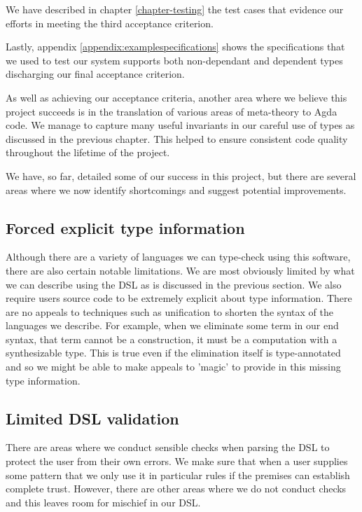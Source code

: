 We have described in chapter \ref{chapter-testing} the test cases that
evidence our efforts in meeting the third acceptance criterion.

Lastly, appendix \ref{appendix:examplespecifications} shows the
specifications that we used to test our system supports both
non-dependant and dependent types discharging our final acceptance
criterion.

As well as achieving our acceptance criteria, another area where we
believe this project succeeds is in the translation of various areas of
meta-theory to Agda code. We manage to capture many useful invariants
in our careful use of types as discussed in the previous chapter. This
helped to ensure consistent code quality throughout the lifetime of
the project. 

We have, so far, detailed some of our success in this project, but there
are several areas where we now identify shortcomings and suggest
potential improvements.

\subsection{Forced explicit type information}

Although there are a variety of languages we can type-check
using this software, there are also certain notable limitations. We
are most obviously limited by what we can describe using the
DSL as is discussed in the previous section. We also require users
source code to be extremely explicit about type information. There are
no appeals to techniques such as unification to shorten the
syntax of the languages we describe. For example, when we eliminate
some term in our end syntax, that term cannot be a construction, it
must be a computation with a synthesizable type. This is true even if
the elimination itself is type-annotated and so we might be able to
make appeals to 'magic' to provide in this missing type information.

\subsection{Limited DSL validation}

There are areas where we conduct sensible checks when parsing the DSL
to protect the user from their own errors. We make sure that
when a user supplies some pattern that we only use it in particular
rules if the premises can establish complete trust. However,
there are other areas where we do not conduct checks and this leaves
room for mischief in our DSL.

